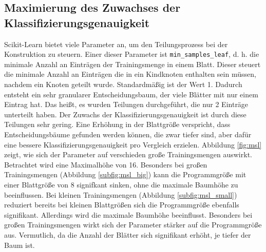 \subsection{Maximierung des Zuwachses der Klassifizierungsgenauigkeit}
Scikit-Learn bietet viele Parameter an, um den Teilungsprozess bei der Konstruktion zu steuern. Einer dieser Parameter ist \texttt{min\_samples\_leaf}, d. h. die minimale Anzahl an Einträgen der Trainingsmenge
in einem Blatt. Dieser steuert die minimale Anzahl an Einträgen die in ein Kindknoten enthalten sein müssen, nachdem ein Knoten geteilt wurde. Standardmäßig ist der Wert 1. Dadurch entsteht ein sehr granularer
Entscheidungsbaum, der viele Blätter mit nur einem Eintrag hat. Das heißt, es wurden Teilungen durchgeführt, die nur 2 Einträge unterteilt haben. Der Zuwachs der Klassifizierungsgenauigkeit ist durch diese
Teilungen sehr gering. Eine Erhöhung in der Blattgröße verspricht, dass Entscheidungsbäume gefunden werden können, die zwar tiefer sind, aber dafür eine bessere Klassifizierungsgenauigkeit pro Vergleich erzielen.
\newline
\newline
Abbildung \ref{fig:msl} zeigt, wie sich der Parameter auf verschieden große Trainingsmengen auswirkt. Betrachtet wird eine Maximalhöhe von 16. Besonders bei großen Trainingsmengen (Abbildung \ref{subfig:msl_big})
kann die Programmgröße mit einer Blattgröße von 8 signifkant sinken, ohne die maximale Baumhöhe zu beeinflussen. Bei kleinen Trainingsmengen (Abbildung \ref{subfig:msl_small}) reduziert bereits bei kleinen Blattgrößen
sich die Programmgröße ebenfalls signifikant. Allerdings wird die maximale Baumhöhe beeinflusst. Besonders bei großen Trainingsmengen wirkt sich der Parameter stärker auf die Programmgröße aus.
Vermutlich, da die Anzahl der Blätter sich signifikant erhöht, je tiefer der Baum ist.
